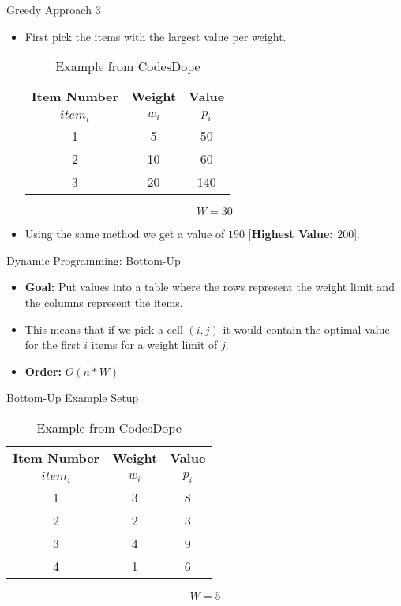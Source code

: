 \documentclass{beamer}
\begin{document}
	\begin{frame}{Greedy Approach 3}
		\begin{itemize}
			\item First pick the items with the largest value per weight.
			\begin{table}[h!]
				\begin{center}
					\caption{Example from CodesDope \cite{noauthor_knapsack_nodate-2}}
					\label{tab:example1.6}
					\begin{tabular}{c|c|c}
						\toprule %
						\textbf{Item Number} & \textbf{Weight} & \textbf{Value}\\
						$item_i$ & $w_i$ & $p_i$ \\
						\midrule %
						1 & 5 & 50 \\
						2 & 10 & 60 \\
						3 & 20 & 140 
					\end{tabular}
				\end{center} \vspace{12pt}
				$$
				W = 30
				$$
			\end{table}
			\item Using the same method we get a value of $190$ [\textbf{Highest Value: $200$}]. 
		\end{itemize}
	\end{frame}

	\begin{frame}{Dynamic Programming: Bottom-Up}
		\begin{itemize}
			\item \textbf{Goal:} Put values into a table where the rows represent the weight limit and the columns represent the items.
			\item This means that if we pick a cell $(i, j)$ it would contain the optimal value for the first $i$ items for a weight limit of $j$.
			\item \textbf{Order:} $O(n*W)$
		\end{itemize}
	\end{frame}

	\begin{frame}{Bottom-Up Example Setup}
		\begin{table}[h!]
			\begin{center}
				\caption{Example from CodesDope \cite{noauthor_knapsack_nodate-2}}
				\label{tab:example2}
				\begin{tabular}{c|c|c}
					\toprule %
					\textbf{Item Number} & \textbf{Weight} & \textbf{Value}\\
					$item_i$ & $w_i$ & $p_i$ \\
					\midrule %
					1 & 3 & 8 \\
					2 & 2 & 3 \\
					3 & 4 & 9 \\
					4 & 1 & 6 
				\end{tabular}
			\end{center} \vspace{12pt}
			$$
			W = 5
			$$
		\end{table}
	\end{frame}
\end{document}
